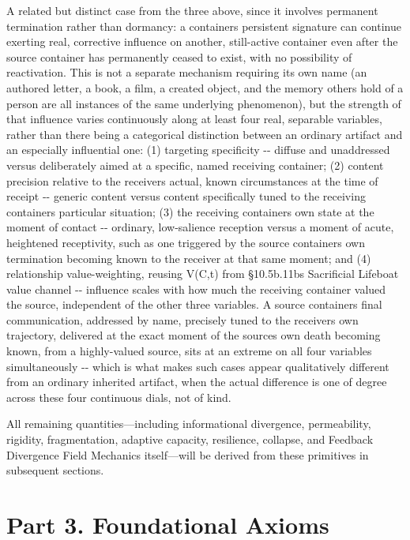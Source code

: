 \documentclass[
]{article}
\begin{document}
A related but distinct case from the three above, since it involves
permanent termination rather than dormancy: a containers persistent
signature can continue exerting real, corrective influence on another,
still-active container even after the source container has permanently
ceased to exist, with no possibility of reactivation. This is not a
separate mechanism requiring its own name (an authored letter, a book, a
film, a created object, and the memory others hold of a person are all
instances of the same underlying phenomenon), but the strength of that
influence varies continuously along at least four real, separable
variables, rather than there being a categorical distinction between an
ordinary artifact and an especially influential one: (1) targeting
specificity -\/- diffuse and unaddressed versus deliberately aimed at a
specific, named receiving container; (2) content precision relative to
the receivers actual, known circumstances at the time of receipt -\/-
generic content versus content specifically tuned to the receiving
containers particular situation; (3) the receiving containers own state
at the moment of contact -\/- ordinary, low-salience reception versus a
moment of acute, heightened receptivity, such as one triggered by the
source containers own termination becoming known to the receiver at that
same moment; and (4) relationship value-weighting, reusing V(C,t) from
§10.5b.11bs Sacrificial Lifeboat value channel -\/- influence scales
with how much the receiving container valued the source, independent of
the other three variables. A source containers final communication,
addressed by name, precisely tuned to the receivers own trajectory,
delivered at the exact moment of the sources own death becoming known,
from a highly-valued source, sits at an extreme on all four variables
simultaneously -\/- which is what makes such cases appear qualitatively
different from an ordinary inherited artifact, when the actual
difference is one of degree across these four continuous dials, not of
kind.

All remaining quantities---including informational divergence,
permeability, rigidity, fragmentation, adaptive capacity, resilience,
collapse, and Feedback Divergence Field Mechanics itself---will be
derived from these primitives in subsequent sections.

\hypertarget{part-3.-foundational-axioms}{%
\section{Part 3. Foundational
Axioms}\label{part-3.-foundational-axioms}}
\end{document}
